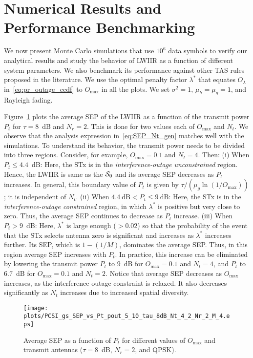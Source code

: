 \documentclass[12pt,draftcls,peerreview,onecolumn]{IEEEtran}
\newcommand{\lam}{\lambda}
\newcommand{\lamstar}{\lam^{*}}
\newcommand{\mug}{{\mu_{g}}}
\newcommand{\muh}{{\mu_{h}}}
\newcommand{\Nt}{{N_t}}
\newcommand{\Nr}{{N_r}}
\newcommand{\Pt}{{P_t}}
\newcommand{\noisevar}{\sigma^2}
\newcommand{\outmax}{O_{\text{max}}}
\newcommand{\itau}{\tau}
\newcommand{\out}{O}
\newcommand{\caluncons}{{\cal S_{\text{0}}}}
\newcommand{\outlam}{\out_{\lam}}
\begin{document}
\section{Numerical Results and Performance Benchmarking}
\label{sec:results}
We now present Monte Carlo simulations that use $10^6$ data symbols to verify our analytical results  and study the behavior of LWIIR as a function of different system parameters. We also benchmark its performance against other TAS rules proposed in the literature. We use the optimal penalty factor $\lamstar$ that equates $\outlam$ in~\eqref{eq:pr_outage_ccdf} to $\outmax$ in all the plots. We set $\noisevar =1$, $\muh =\mug = 1$, and Rayleigh fading. 

Figure~\ref{fig:SEP_vs_PT} plots the average SEP of the LWIIR as a function of the transmit power $\Pt$ for $\itau=8$~dB and $\Nr=2$. This is done for two values each of $\outmax$ and $\Nt$. We observe that the analysis expression in~\eqref{eq:SEP_Nt_gen} matches well with the simulations. To understand its behavior, the transmit power needs to be divided into three regions. Consider, for example, $\outmax=0.1$ and $\Nt=4$. Then: (i) When $\Pt \leq 4.4$~dB: Here, the STx is in the {\em interference-outage unconstrained} region. Hence, the LWIIR is same as the $\caluncons$ and its average SEP decreases as $\Pt$ increases. In general, this boundary value of $\Pt$ is given by ${\tau}/{\left(\mug\ln\left(1/\outmax\right)\right)}$; it is independent of $\Nt$. (ii) When $4.4~\text{dB} <\Pt \leq 9~\text{dB}$: Here, the STx is in the {\em interference-outage constrained} region, in which $\lamstar$ is positive but very close to zero. Thus, the average SEP continues to decrease as $\Pt$ increase. (iii) When $\Pt > 9$~dB: Here, $\lamstar$ is large enough ($>0.02$) so that the probability of the event that the STx selects antenna zero is significant and increases as $\lamstar$ increases further. Its SEP, which is $1- ({1}/{M})$, dominates the average SEP. Thus, in this region average SEP increases with $\Pt$. In practice, this increase can be eliminated by lowering the transmit power  $\Pt$ to $9$~dB for $\outmax=0.1$ and $\Nt=4$, and $\Pt$ to $6.7$~dB for $\outmax=0.1$ and $\Nt=2$. Notice that average SEP decreases as $\outmax$ increases, as the interference-outage constraint is relaxed. It also decreases significantly as $\Nt$ increases due to increased spatial diversity.      

\begin{figure}
  \centering \texttt{[image: plots/PCSI\_gs\_SEP\_vs\_Pt\_pout\_5\_10\_tau\_8dB\_Nt\_4\_2\_Nr\_2\_M\_4.eps]}
  \caption{Average SEP as a function of $\Pt$ for different values of $\outmax$ and transmit antennas ($\itau = 8$~dB, $\Nr=2$, and QPSK).}
\label{fig:SEP_vs_PT}
\end{figure}
\end{document}
